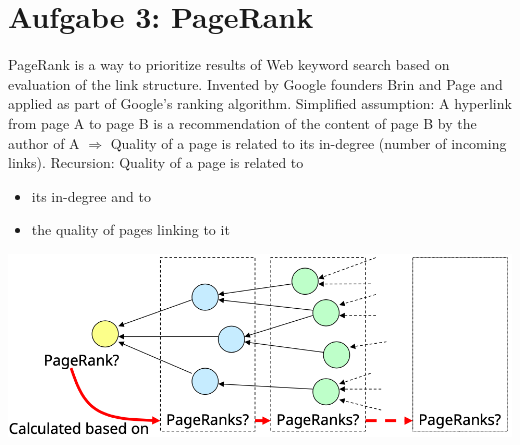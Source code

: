 \documentclass{article}
\begin{document}
	\section*{Aufgabe 3: PageRank}
	PageRank is a way to prioritize results of Web keyword search based on evaluation of the link structure. Invented by Google founders Brin and Page and applied as part of Google’s ranking algorithm. Simplified assumption: A hyperlink from page A to page B is a recommendation of the content of page B by the author of A $\Rightarrow$ Quality of a page is related to its in-degree (number of incoming links). Recursion: Quality of a page is related to
	\begin{itemize}
		\item its in-degree and to
		\item the quality of pages linking to it
	\end{itemize}
	\begin{center}
		\includegraphics[scale=0.3]{pagerank}
	\end{center}
\end{document}
